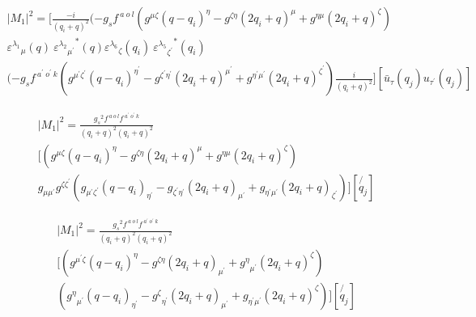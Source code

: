 \begin{equation}
\begin{split}
|M_1|^2=[\frac{-i}{(q_i +q)^2}(-g_s f^{\:a\:o\:l}(g^{{\mu}{\zeta}}(q-q_i)^{\eta}-g^{{\zeta}{\eta}}(2q_i +q)^{\mu}+g^{{\eta}{\mu}}(2q_i +q)^{\zeta})\\
{\varepsilon^{\lambda_1}}_{\mu} (q)\:{{\varepsilon^{\lambda_2}}_{{\mu}^{\prime}}}^* (q) {\varepsilon^{\lambda_6}}_{\zeta} (q_i)\:{{\varepsilon^{\lambda_5}}_{{\zeta}^{\prime}}}^* (q_i)\\
(-g_s f^{\:a^{\prime}\:o^{\prime}\:k}(g^{{{\mu}^{\prime}}{{\zeta}^{\prime}}}(q-q_i)^{{\eta}^{\prime}}-g^{{{\zeta}^{\prime}}{{\eta}^{\prime}}}(2q_i +q)^{{\mu}^{\prime}}+g^{{{\eta}^{\prime}}{{\mu}^{\prime}}}(2q_i +q)^{{\zeta}^{\prime}})\frac{i}{(q_i +q)^2}][\bar{u}_{\tau}(q_j){u}_{{\tau}^{\prime}}(q_j)]
\end{split}
\end{equation}


\begin{equation}
\begin{split}
|M_1|^2=\frac{{g_s}^2 f^{\:a\:o\:l} f^{\:a^{\prime}\:o^{\prime}\:k}}{(q_i +q)^2 (q_i +q)^2}\\
[(g^{{\mu}{\zeta}}(q-q_i)^{\eta}-g^{{\zeta}{\eta}}(2q_i +q)^{\mu}+g^{{\eta}{\mu}}(2q_i +q)^{\zeta})\\
g_{{\mu}{{\mu}^{\prime}}} g^{{\zeta}{{\zeta}^{\prime}}}
(g_{{{\mu}^{\prime}}{{\zeta}^{\prime}}}(q-q_i)_{{\eta}^{\prime}}-g_{{{\zeta}^{\prime}}{{\eta}^{\prime}}}(2q_i +q)_{{\mu}^{\prime}}+g_{{{\eta}^{\prime}}{{\mu}^{\prime}}}(2q_i +q)_{{\zeta}^{\prime}})][\not{q_j}]
\end{split}
\end{equation}



\begin{equation}
\begin{split}
|M_1|^2=\frac{{g_s}^2 f^{\:a\:o\:l} f^{\:a^{\prime}\:o^{\prime}\:k}}{(q_i +q)^2 (q_i +q)^2}\\
[(g^{{{\mu}^{\prime}}{\zeta}}(q-q_i)^{\eta}-g^{{\zeta}{\eta}}(2q_i +q)_{{\mu}^{\prime}}+{g^{\eta}}_{{\mu}^{\prime}}(2q_i +q)^{\zeta})\\
({g^{\eta}}_{{\mu}^{\prime}}(q-q_i)_{{\eta}^{\prime}}-{g^{\zeta}}_{{\eta}^{\prime}}(2q_i +q)_{{\mu}^{\prime}}+g_{{{\eta}^{\prime}}{{\mu}^{\prime}}}(2q_i +q)^{\zeta})][\not{q_j}]
\end{split}
\end{equation}


